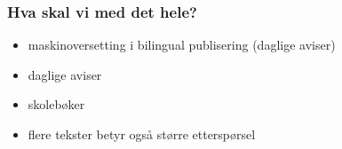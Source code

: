 \documentclass{beamer}
\begin{document}
\begin{frame}

\begin{figure}
  \par%

\end{figure}

\end{frame}



\begin{frame}\frametitle{Hva skal vi med det hele?} 
\begin{itemize}
\item maskinoversetting i bilingual publisering (daglige aviser)
\item daglige aviser
\item skolebøker
\item flere tekster betyr også større etterspørsel
\end{itemize}
\end{frame}
\end{document}
